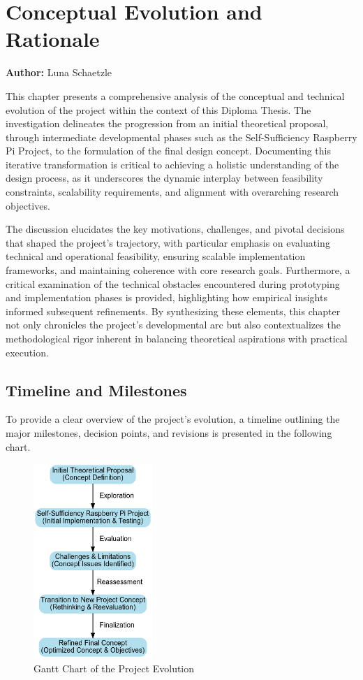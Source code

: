 \chapter{Conceptual Evolution and Rationale}
\label{chap:Conceptual_Evolution_and_Rationale}
\textbf{Author:} Luna Schaetzle

This chapter presents a comprehensive analysis of the conceptual and technical evolution of the project within the context of this Diploma Thesis. The investigation delineates the progression from an initial theoretical proposal, through intermediate developmental phases such as the Self-Sufficiency Raspberry Pi Project, to the formulation of the final design concept. Documenting this iterative transformation is critical to achieving a holistic understanding of the design process, as it underscores the dynamic interplay between feasibility constraints, scalability requirements, and alignment with overarching research objectives.

The discussion elucidates the key motivations, challenges, and pivotal decisions that shaped the project’s trajectory, with particular emphasis on evaluating technical and operational feasibility, ensuring scalable implementation frameworks, and maintaining coherence with core research goals. Furthermore, a critical examination of the technical obstacles encountered during prototyping and implementation phases is provided, highlighting how empirical insights informed subsequent refinements. By synthesizing these elements, this chapter not only chronicles the project’s developmental arc but also contextualizes the methodological rigor inherent in balancing theoretical aspirations with practical execution.

\section{Timeline and Milestones}

To provide a clear overview of the project's evolution, a timeline outlining the major milestones, decision points, and revisions is presented in the following chart.
\begin{figure}[H]
    \centering
    \includegraphics[width=0.4\textwidth]{figures/concept_change_flowchart.png}
    \caption{Gantt Chart of the Project Evolution}
    \label{fig:GanttChart}
\end{figure}

